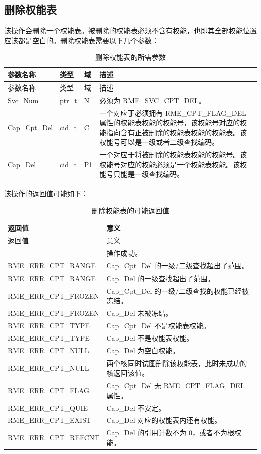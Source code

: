 \subsection{删除权能表}\label{subsec:2-delete-a-capability-table}

该操作会删除一个权能表。被删除的权能表必须不含有权能，也即其全部权能位置应该都是空白的。删除权能表需要以下几个参数：

\begin{xltabular}{\textwidth}{@{}>{\hsize\raggedright\arraybackslash}X>{\hsize\raggedright\arraybackslash}X>{\hsize\raggedright\arraybackslash}X>{\hsize\raggedright\arraybackslash}X@{}}
\caption{删除权能表的所需参数}\label{tab:2-7-delete-capability-table-parameters}\\
\toprule
参数名称 & 类型 & 域 & 描述\tabularnewline
\endfirsthead
\toprule
参数名称 & 类型 & 域 & 描述\tabularnewline
\midrule
\endhead
\bottomrule
\endlastfoot
Svc\_Num & ptr\_t & N & 必须为 RME\_SVC\_CPT\_DEL。\tabularnewline
Cap\_Cpt\_Del & cid\_t & C &
一个对应于必须拥有 RME\_CPT\_FLAG\_DEL 属性的权能表权能的权能号，该权能号对应的权能指向含有正被删除的权能表权能的权能表。该权能号可以是一级或者二级查找编码。\tabularnewline
Cap\_Del & cid\_t & P1 &
一个对应于将被删除的权能表权能的权能号。该权能号对应的权能必须是一个权能表权能。该权能号只能是一级查找编码。\tabularnewline
\end{xltabular}

该操作的返回值可能如下：

\begin{xltabular}{\textwidth}{@{}>{\hsize\raggedright\arraybackslash}X>{\hsize\raggedright\arraybackslash}X@{}}
\caption{删除权能表的可能返回值}\label{tab:2-8-delete-capability-table-return-values}\\
\toprule
返回值 & 意义\tabularnewline
\endfirsthead
\toprule
返回值 & 意义\tabularnewline
\midrule
\endhead
\bottomrule
{} & 操作成功。\tabularnewline
    RME\_ERR\_CPT\_RANGE & Cap\_Cpt\_Del 的一级/二级查找超出了范围。\tabularnewline
    RME\_ERR\_CPT\_RANGE & Cap\_Del 的一级查找超出了范围。\tabularnewline
    RME\_ERR\_CPT\_FROZEN & Cap\_Cpt\_Del 的一级/二级查找的权能已经被冻结。\tabularnewline
    RME\_ERR\_CPT\_FROZEN & Cap\_Del 未被冻结。\tabularnewline
    RME\_ERR\_CPT\_TYPE & Cap\_Cpt\_Del 不是权能表权能。\tabularnewline
    RME\_ERR\_CPT\_TYPE & Cap\_Del 不是权能表权能。\tabularnewline
    RME\_ERR\_CPT\_NULL & Cap\_Del 为空白权能。\tabularnewline
    RME\_ERR\_CPT\_NULL & 两个核同时试图删除该权能表，此时未成功的核返回该值。\tabularnewline
    RME\_ERR\_CPT\_FLAG & Cap\_Cpt\_Del 无 RME\_CPT\_FLAG\_DEL 属性。\tabularnewline
    RME\_ERR\_CPT\_QUIE & Cap\_Del 不安定。\tabularnewline
    RME\_ERR\_CPT\_EXIST & Cap\_Del 对应的权能表内还有权能。\tabularnewline
    RME\_ERR\_CPT\_REFCNT & Cap\_Del 的引用计数不为 0，或者不为根权能。\tabularnewline
\end{xltabular}

